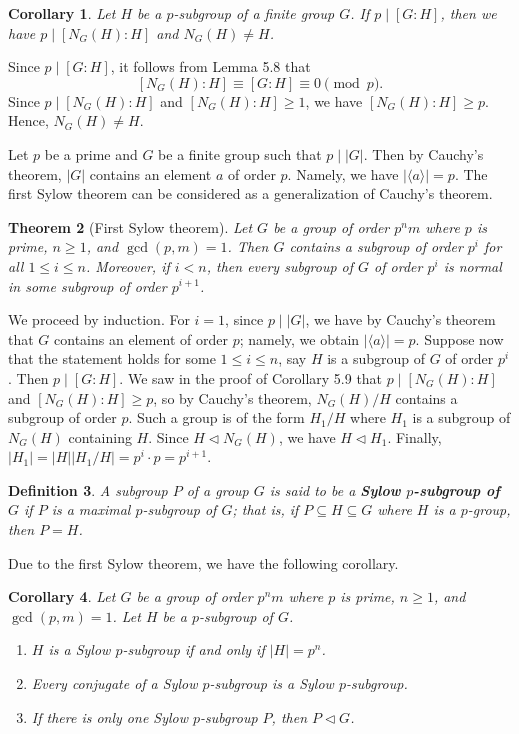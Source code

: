\documentclass[10pt]{article}
\makeatletter
\newcommand{\norm}{\triangleleft}
\theoremstyle{newstyle}
\newtheorem{thm}{Theorem}[section]
\newtheorem{cor}[thm]{Corollary}
\newtheorem{defn}[thm]{Definition}
\newenvironment{pf}[1][\proofname]{\par
  \pushQED{\qed}%
  \normalfont \topsep0\p@\relax
  \trivlist
  \item[\hskip\labelsep\scshape
  #1\@addpunct{.}]\ignorespaces
}{%
  \popQED\endtrivlist\@endpefalse
}
\makeatother
\begin{document}
\begin{cor}
Let $H$ be a $p$-subgroup of a finite group $G$. If $p \mid [G : H]$, then we have
$p \mid [N_G(H) : H]$ and $N_G(H) \neq H$. 
\end{cor}
\begin{pf}
Since $p \mid [G : H]$, it follows from Lemma 5.8 that 
\[ [N_G(H) : H] \equiv [G : H] \equiv 0 \pmod p. \]
Since $p \mid [N_G(H) : H]$ and $[N_G(H) : H] \geq 1$, we have $[N_G(H) : H] \geq p$. 
Hence, $N_G(H) \neq H$. 
\end{pf}

Let $p$ be a prime and $G$ be a finite group such that $p \mid |G|$. Then by Cauchy's theorem, 
$|G|$ contains an element $a$ of order $p$. Namely, we have $|\langle a \rangle| = p$. 
The first Sylow theorem can be considered as a generalization of Cauchy's theorem. 

\begin{thm}[First Sylow theorem]
Let $G$ be a group of order $p^nm$ where $p$ is prime, $n \geq 1$, and $\gcd(p, m) = 1$. 
Then $G$ contains a subgroup of order $p^i$ for all $1 \leq i \leq n$. Moreover, 
if $i < n$, then every subgroup of $G$ of order $p^i$ is normal in some subgroup of order $p^{i+1}$. 
\end{thm}
\begin{pf}
We proceed by induction. For $i = 1$, since $p \mid |G|$, we have by Cauchy's theorem that 
$G$ contains an element of order $p$; namely, we obtain $|\langle a \rangle| = p$. 
Suppose now that the statement holds for some $1 \leq i \leq n$, say $H$ is a subgroup of $G$ 
of order $p^i$. Then $p \mid [G : H]$. We saw in the proof of Corollary 5.9 that 
$p \mid [N_G(H) : H]$ and $[N_G(H) : H] \geq p$, so by Cauchy's theorem, 
$N_G(H)/H$ contains a subgroup of order $p$. Such a group is of the form 
$H_1/H$ where $H_1$ is a subgroup of $N_G(H)$ containing $H$. Since $H \norm N_G(H)$, 
we have $H \norm H_1$. Finally, $|H_1| = |H| |H_1/H| = p^i \cdot p = p^{i+1}$. 
\end{pf}

\begin{defn}
A subgroup $P$ of a group $G$ is said to be a {\bf Sylow $p$-subgroup of $G$} if $P$ is a 
maximal $p$-subgroup of $G$; that is, if $P \subseteq H \subseteq G$ where $H$ is a $p$-group, 
then $P = H$. 
\end{defn}

Due to the first Sylow theorem, we have the following corollary. 

\begin{cor}
Let $G$ be a group of order $p^nm$ where $p$ is prime, $n\geq 1$, and $\gcd(p, m) = 1$. 
Let $H$ be a $p$-subgroup of $G$.
\begin{enumerate}[(1)]
    \item $H$ is a Sylow $p$-subgroup if and only if $|H| = p^n$. 
    \item Every conjugate of a Sylow $p$-subgroup is a Sylow $p$-subgroup. 
    \item If there is only one Sylow $p$-subgroup $P$, then $P \norm G$. 
\end{enumerate}
\end{cor}
\end{document}
